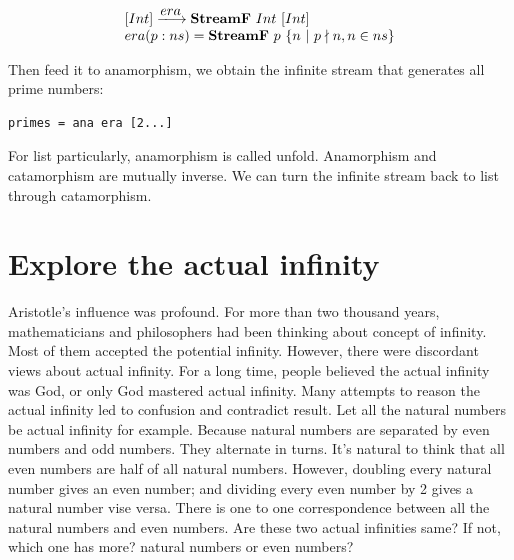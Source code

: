 \documentclass{article}
\begin{document}
\[
\begin{array}{l}
[Int] \arrowto{era} \mathbf{StreamF}\ Int\ [Int] \\
era (p:ns) = \mathbf{StreamF}\ p\ \{ n\ |\ p \nmid n, n \in ns\} \\
\end{array}
\]

Then feed it to anamorphism, we obtain the infinite stream that generates all prime numbers:

\begin{lstlisting}
primes = ana era [2...]
\end{lstlisting}

For list particularly, anamorphism is called unfold. Anamorphism and catamorphism are mutually inverse. We can turn the infinite stream back to list through catamorphism.

\begin{Exercise}
\end{Exercise}

\section{Explore the actual infinity}

Aristotle's influence was profound. For more than two thousand years, mathematicians and philosophers had been thinking about concept of infinity. Most of them accepted the potential infinity. However, there were discordant views about actual infinity. For a long time, people believed the actual infinity was God, or only God mastered actual infinity. Many attempts to reason the actual infinity led to confusion and contradict result. Let all the natural numbers be actual infinity for example. Because natural numbers are separated by even numbers and odd numbers. They alternate in turns. It's natural to think that all even numbers are half of all natural numbers. However, doubling every natural number gives an even number; and dividing every even number by 2 gives a natural number vise versa. There is one to one correspondence between all the natural numbers and even numbers. Are these two actual infinities same? If not, which one has more? natural numbers or even numbers?
\end{document}
